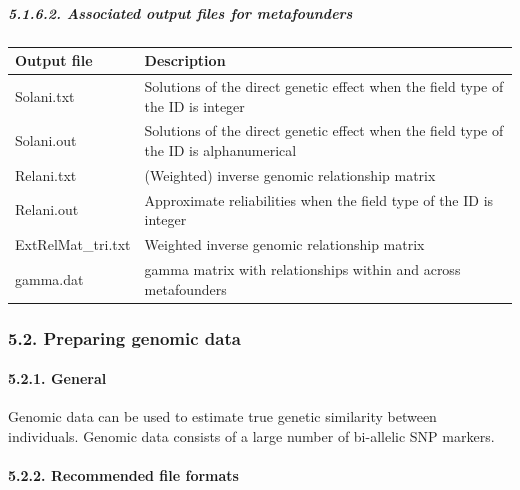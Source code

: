 \subparagraph{5.1.6.2. Associated output files for
metafounders}\label{Gene20}

{\def\LTcaptype{none} %
\begin{longtable}[]{@{}
  >{\raggedright\arraybackslash}p{}
  >{\raggedright\arraybackslash}p{}@{}}
\toprule\noalign{}
\begin{minipage}[b]{\linewidth}\raggedright
Output file
\end{minipage} & \begin{minipage}[b]{\linewidth}\raggedright
Description
\end{minipage} \\
\midrule\noalign{}
\endhead
\bottomrule\noalign{}
\endlastfoot
Solani.txt & Solutions of the direct genetic effect when the field type
of the ID is integer \\
Solani.out & Solutions of the direct genetic effect when the field type
of the ID is alphanumerical \\
Relani.txt & (Weighted) inverse genomic relationship matrix \\
Relani.out & Approximate reliabilities when the field type of the ID is
integer \\
ExtRelMat\_tri.txt & Weighted inverse genomic relationship matrix \\
gamma.dat & gamma matrix with relationships within and across
metafounders \\
\end{longtable}
}

\subsubsection{5.2. Preparing genomic data}\label{Gene21}

\paragraph{5.2.1. General}\label{Gene22}

Genomic data can be used to estimate true genetic similarity between
individuals. Genomic data consists of a large number of bi-allelic SNP
markers.

\paragraph{5.2.2. Recommended file formats}\label{Gene23}

